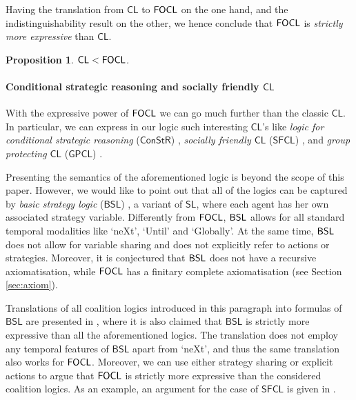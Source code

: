 \documentclass{article}
\newtheorem{proposition}{Proposition}
\begin{document}
Having the translation from $\mathsf{CL}$ to $\mathsf{FOCL}$ on the one hand, and the indistinguishability result on the other, we hence conclude that $\mathsf{FOCL}$ is \textit{strictly more expressive} than $\mathsf{CL}$.

\begin{proposition}
\label{prop:cslVScl}
    $\mathsf{CL} < \mathsf{FOCL}$.
\end{proposition}

\paragraph{Conditional strategic reasoning and socially friendly $\mathsf{CL}$} With the expressive power of $\mathsf{FOCL}$ we can go much further than the classic $\mathsf{CL}$. In particular, we can express in our logic such interesting $\mathsf{CL}$'s like \textit{logic for conditional strategic reasoning} ($\mathsf{ConStR}$) \cite{goranko22}, \textit{socially friendly $\mathsf{CL}$} ($\mathsf{SFCL}$) \cite{goranko18}, and \textit{group protecting $\mathsf{CL}$} ($\mathsf{GPCL}$)  \cite{goranko18}. 

Presenting the semantics of the aforementioned logic is beyond the scope of this paper. However, we would like to point out that all of the logics can be captured by \textit{basic strategy logic} ($\mathsf{BSL}$) \cite{goranko23}, a variant of $\mathsf{SL}$, where each agent has her own associated strategy variable. Differently from $\mathsf{FOCL}$, $\mathsf{BSL}$ allows for all standard temporal modalities like `ne\textsf{X}t', `\textsf{U}ntil' and `\textsf{G}lobally'. At the same time, $\mathsf{BSL}$ does not allow for variable sharing and does not explicitly refer to actions or strategies. Moreover, it is conjectured that $\mathsf{BSL}$ does not have a recursive axiomatisation, while $\mathsf{FOCL}$ has a finitary complete axiomatisation (see Section \ref{sec:axiom}).

Translations of all coalition logics introduced in this paragraph into formulas of $\mathsf{BSL}$ are presented in \cite{goranko23}, where it is also claimed that $\mathsf{BSL}$ is strictly more expressive than all the aforementioned logics. The translation does not employ any temporal features of $\mathsf{BSL}$ apart from `ne\textsf{X}t', and thus the same translation also works for $\mathsf{FOCL}$. Moreover, we can use either strategy sharing or explicit actions to argue that $\mathsf{FOCL}$ is strictly more expressive than the considered coalition logics. As an example, an argument for the case of $\mathsf{SFCL}$ is given in \cite{csl}. %
\end{document}
